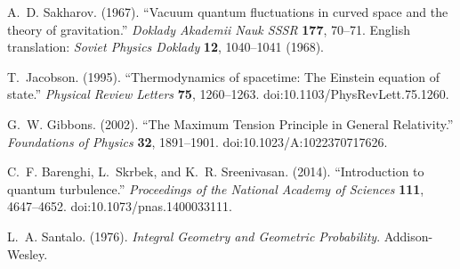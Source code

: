 

A.~D. Sakharov. (1967).
``Vacuum quantum fluctuations in curved space and the theory of gravitation.''
\emph{Doklady Akademii Nauk SSSR} \textbf{177}, 70--71.
English translation: \emph{Soviet Physics Doklady} \textbf{12}, 1040--1041 (1968).

T.~Jacobson. (1995).
``Thermodynamics of spacetime: The Einstein equation of state.''
\emph{Physical Review Letters} \textbf{75}, 1260--1263.
doi:10.1103/PhysRevLett.75.1260.

G.~W. Gibbons. (2002).
``The Maximum Tension Principle in General Relativity.''
\emph{Foundations of Physics} \textbf{32}, 1891--1901.
doi:10.1023/A:1022370717626.

C.~F. Barenghi, L.~Skrbek, and K.~R. Sreenivasan. (2014).
``Introduction to quantum turbulence.''
\emph{Proceedings of the National Academy of Sciences} \textbf{111}, 4647--4652.
doi:10.1073/pnas.1400033111.

L.~A. Santalo. (1976).
\emph{Integral Geometry and Geometric Probability}.
Addison-Wesley.
